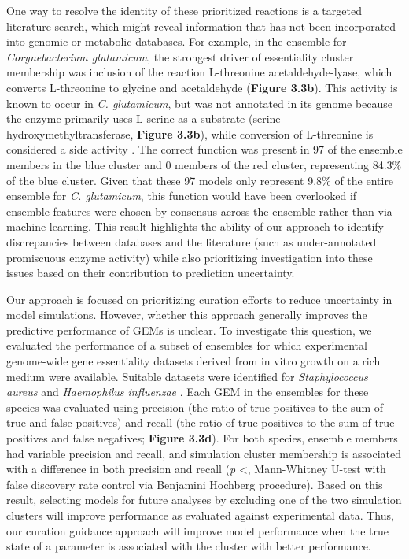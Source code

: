 \documentclass[11pt,twocolumn,notitlepage,openany,twoside]{book}
\begin{document}
\begin{refsection}
One way to resolve the identity of these prioritized reactions is a targeted literature search, which might reveal information that has not been incorporated into genomic or metabolic databases. For example, in the ensemble for \textit{Corynebacterium glutamicum}, the strongest driver of essentiality cluster membership was inclusion of the reaction L-threonine acetaldehyde-lyase, which converts L-threonine to glycine and acetaldehyde (\textbf{Figure 3.3b}). This activity is known to occur in \textit{C. glutamicum}, but was not annotated in its genome because the enzyme primarily uses L-serine as a substrate (serine hydroxymethyltransferase, \textbf{Figure 3.3b}), while conversion of L-threonine is considered a side activity \cite{Dong2011-wt,Simic2002-ia}. The correct function was present in 97 of the ensemble members in the blue cluster and 0 members of the red cluster, representing 84.3\% of the blue cluster. Given that these 97 models only represent 9.8\% of the entire ensemble for \textit{C. glutamicum}, this function would have been overlooked if ensemble features were chosen by consensus across the ensemble rather than via machine learning. This result highlights the ability of our approach to identify discrepancies between databases and the literature (such as under-annotated promiscuous enzyme activity) while also prioritizing investigation into these issues based on their contribution to prediction uncertainty.

Our approach is focused on prioritizing curation efforts to reduce uncertainty in model simulations. However, whether this approach generally improves the predictive performance of GEMs is unclear. To investigate this question, we evaluated the performance of a subset of ensembles for which experimental genome-wide gene essentiality datasets derived from in vitro growth on a rich medium were available. Suitable datasets were identified for \textit{Staphylococcus aureus} \cite{Chaudhuri2009-za} and \textit{Haemophilus influenzae} \cite{Akerley2002-ja}. Each GEM in the ensembles for these species was evaluated using precision (the ratio of true positives to the sum of true and false positives) and recall (the ratio of true positives to the sum of true positives and false negatives; \textbf{Figure 3.3d}). For both species, ensemble members had variable precision and recall, and simulation cluster membership is associated with a difference in both precision and recall (\textit{p} \textless{}, Mann-Whitney U-test with false discovery rate control via Benjamini Hochberg procedure). Based on this result, selecting models for future analyses by excluding one of the two simulation clusters will improve performance as evaluated against experimental data. Thus, our curation guidance approach will improve model performance when the true state of a parameter is associated with the cluster with better performance.


\end{refsection}
\end{document}

